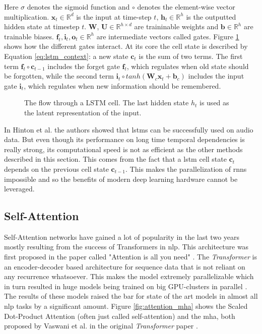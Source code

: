 Here $\sigma$ denotes the sigmoid function and $\circ$ denotes the element-wise vector multiplication. $\mathbf{x}_t \in \mathbb{R}^d$ is the input at time-step $t$, $ \mathbf{h}_t \in \mathbb{R}^h$ is the outputted hidden state at timestep $t$. $\mathbf{W}$, $\mathbf{U} \in \mathbb{R}^{h \times d}$ are traininable weights and $\mathbf{b} \in \mathbb{R}^h$ are trainable biases. $\mathbf{f}_t, \mathbf{i}_t, \mathbf{o}_t \in \mathbb{R}^h$ are intermediate vectors called gates. Figure \ref{fig:lstm_cell} shows how the different gates interact. At its core the cell state is described by Equation \ref{eq:lstm_context}: a new state $ \mathbf{c}_t$ is the sum of two terms. The first term $\mathbf{f}_t \circ  \mathbf{c}_{t-1}$ includes the forget gate $ \mathbf{f}_t$, which regulates when old state should be forgotten, while the second term $ \mathbf{i}_t \circ tanh ( \mathbf{W}_c  \mathbf{x}_t +  \mathbf{b}_c)$ includes the input gate $ \mathbf{i}_t$, which regulates when new information should be remembered.

\begin{figure}[!h]
    \centering
    
    \caption[LSTM cell Overview]{The flow through a LSTM cell. The last hidden state $h_t$ is used as the latent representation of the input.}
    \label{fig:lstm_cell}
\end{figure}

In Hinton et al. \cite{graves2013speech} the authors showed that \glspl{lstm} can be successfully used on audio data. But even though its performance on long time temporal dependencies is really strong, its computational speed is not as efficient as the other methods described in this section. This comes from the fact that a \gls{lstm} cell state $ \mathbf{c}_t$ depends on the previous cell state $ \mathbf{c}_{t-1}$. This makes the parallelization of \glspl{rnn} impossible and so the benefits of modern deep learning hardware cannot be leveraged.

\subsection{Self-Attention}

Self-Attention networks have gained a lot of popularity in the last two years mostly resulting from the success of Transformers in \gls{nlp}. This architecture was first proposed in the paper called "Attention is all you need" \cite{NIPS2017_7181}. The \textit{Transformer} is an encoder-decoder based architecture for sequence data that is not reliant on any recurrence whatsoever. This makes the model extremely parallelizable which in turn resulted in huge models being trained on big GPU-clusters in parallel \cite{brown2020language}. The results of these models raised the bar for state of the art models in almost all \gls{nlp} tasks by a significant amount. Figure \ref{fig:attention_mha} shows the Scaled Dot-Product Attention (often just called self-attention) and the \gls{mha}, both proposed by Vaswani et al. in the original \textit{Transformer} paper \cite{NIPS2017_7181}.

